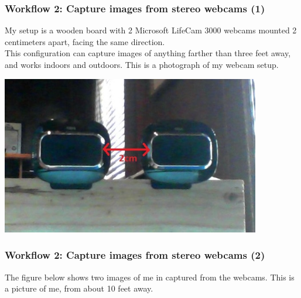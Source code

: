 \documentclass[19pt]{beamer}
\begin{document}
\begin{frame}
\frametitle{Workflow 2: Capture images from stereo webcams (1)}

My setup is a wooden board with 2 Microsoft LifeCam 3000 webcams mounted 2 centimeters apart, facing the same direction. \\[15pt]
%
This configuration can capture images of anything farther than three feet away, and works indoors and outdoors. This is a photograph of my webcam setup.

\begin{mdframed}
\centering
\includegraphics[width=0.85\textwidth, trim=30 50 45 50, clip]{images/setup.jpg}
\end{mdframed}

\end{frame}


\begin{frame}
\frametitle{Workflow 2: Capture images from stereo webcams (2)}

The figure below shows two images of me in captured from the webcams. 
This is a picture of me, from about 10 feet away.


\end{frame}
\end{document}
